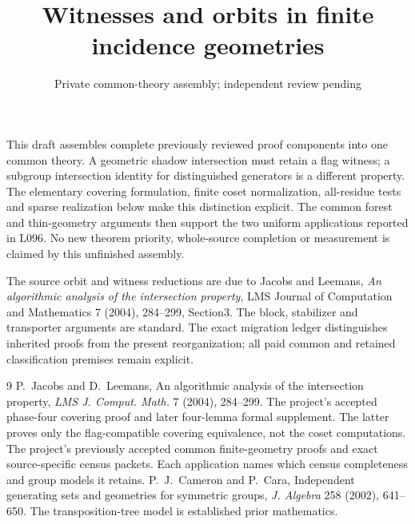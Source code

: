 \documentclass[11pt,a4paper]{article}
\title{Witnesses and orbits in finite incidence geometries}
\author{Private common-theory assembly; independent review pending}
\date{}
\begin{document}
\maketitle
This draft assembles complete previously reviewed proof components into
one common theory. A geometric shadow intersection must retain a flag
witness; a subgroup intersection identity for distinguished generators
is a different property. The elementary covering formulation, finite
coset normalization, all-residue tests and sparse realization below
make this distinction explicit. The common forest and thin-geometry
arguments then support the two uniform applications reported in L096.
No new theorem priority, whole-source completion or measurement is
claimed by this unfinished assembly.

The source orbit and witness reductions are due to Jacobs and Leemans,
\emph{An algorithmic analysis of the intersection property}, LMS Journal
of Computation and Mathematics 7 (2004), 284--299, Section3. The block,
stabilizer and transporter arguments are standard. The exact migration
ledger distinguishes inherited proofs from the present reorganization;
all paid common and retained classification premises remain explicit.








\begin{thebibliography}{9}
 P.~Jacobs and D.~Leemans, An algorithmic analysis of the
intersection property, \emph{LMS J. Comput. Math.} 7 (2004), 284--299.
 The project's accepted phase-four covering proof
and later four-lemma formal supplement. The latter proves only the
flag-compatible covering equivalence, not the coset computations.
 The project's previously accepted common finite-geometry
proofs and exact source-specific census packets. Each application names
which census completeness and group models it retains.
 P.~J.~Cameron and P.~Cara, Independent generating sets
and geometries for symmetric groups, \emph{J. Algebra} 258 (2002), 641--650.
The transposition-tree model is established prior mathematics.
\end{thebibliography}
\end{document}
